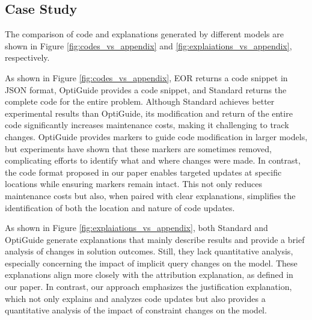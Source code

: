 \subsection{Case Study}
\label{appendix:case}
The comparison of code and explanations generated by different models are shown in Figure \ref{fig:codes_vs_appendix} and \ref{fig:explaiations_vs_appendix}, respectively.

As shown in Figure \ref{fig:codes_vs_appendix}, EOR returns a code snippet in JSON format, OptiGuide provides a code snippet, and Standard returns the complete code for the entire problem. Although Standard achieves better experimental results than OptiGuide, its modification and return of the entire code significantly increases maintenance costs, making it challenging to track changes. OptiGuide provides markers to guide code modification in larger models, but experiments have shown that these markers are sometimes removed, complicating efforts to identify what and where changes were made. In contrast, the code format proposed in our paper enables targeted updates at specific locations while ensuring markers remain intact. This not only reduces maintenance costs but also, when paired with clear explanations, simplifies the identification of both the location and nature of code updates.

As shown in Figure \ref{fig:explaiations_vs_appendix}, both Standard and OptiGuide generate explanations that mainly describe results and provide a brief analysis of changes in solution outcomes. Still, they lack quantitative analysis, especially concerning the impact of implicit query changes on the model. These explanations align more closely with the attribution explanation, as defined in our paper. In contrast, our approach emphasizes the justification explanation, which not only explains and analyzes code updates but also provides a quantitative analysis of the impact of constraint changes on the model.

